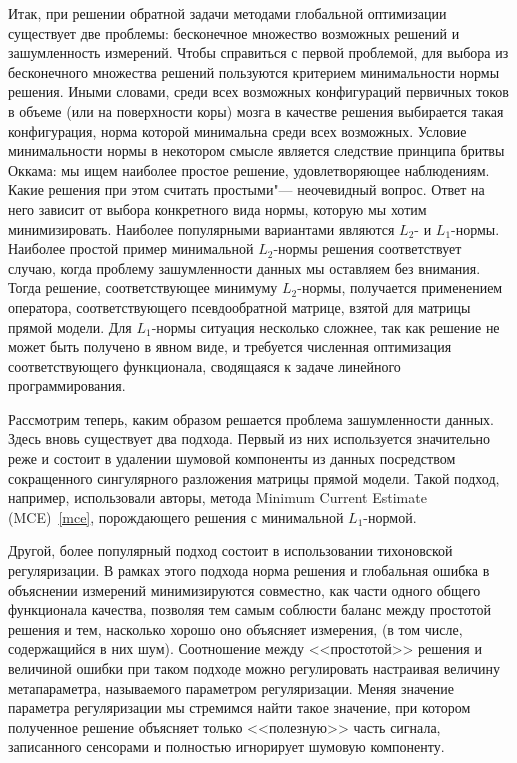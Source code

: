 Итак, при решении обратной задачи методами глобальной оптимизации существует
две проблемы: бесконечное множество возможных решений и зашумленность
измерений. Чтобы справиться с первой проблемой, для выбора из бесконечного
множества решений пользуются критерием минимальности нормы решения. Иными
словами, среди всех возможных конфигураций первичных токов в объеме (или на
поверхности коры) мозга в качестве решения выбирается такая конфигурация, норма
которой минимальна среди всех возможных.  Условие минимальности нормы в
некотором смысле является следствие принципа бритвы Оккама: мы ищем наиболее
простое решение, удовлетворяющее наблюдениям. Какие решения при этом считать
простыми"--- неочевидный вопрос.  Ответ на него зависит от выбора конкретного
вида нормы, которую мы хотим минимизировать.  Наиболее популярными вариантами
являются $L_2$- и $L_1$-нормы.  Наиболее простой пример минимальной $L_2$-нормы
решения соответствует случаю, когда проблему зашумленности данных мы оставляем
без внимания.  Тогда решение, соответствующее минимуму $L_2$-нормы, получается
применением оператора, соответствующего псевдообратной матрице, взятой для
матрицы прямой модели.  Для $L_1$-нормы ситуация несколько сложнее, так как
решение не может быть получено в явном виде, и требуется численная оптимизация
соответствующего функционала, сводящаяся к задаче линейного программирования.

Рассмотрим теперь, каким образом решается проблема зашумленности данных. Здесь
вновь существует два подхода.  Первый из них используется значительно реже и
состоит в удалении шумовой компоненты из данных посредством сокращенного
сингулярного разложения матрицы прямой модели. Такой подход, например,
использовали авторы, метода Minimum Current Estimate (MCE)~\ref{mce},
порождающего решения с минимальной $L_1$-нормой.

Другой, более популярный подход состоит в использовании тихоновской
регуляризации. В рамках этого подхода норма решения и глобальная ошибка в
объяснении измерений минимизируются совместно, как части одного общего
функционала качества, позволяя тем самым соблюсти баланс между простотой
решения и тем, насколько хорошо оно объясняет измерения, (в том числе,
содержащийся в них шум). Соотношение между <<простотой>> решения и величиной ошибки при
таком подходе можно регулировать настраивая величину метапараметра,
называемого параметром регуляризации. Меняя значение параметра регуляризации
мы стремимся найти такое значение, при котором полученное решение объясняет
только <<полезную>> часть сигнала, записанного сенсорами и полностью игнорирует
шумовую компоненту.

